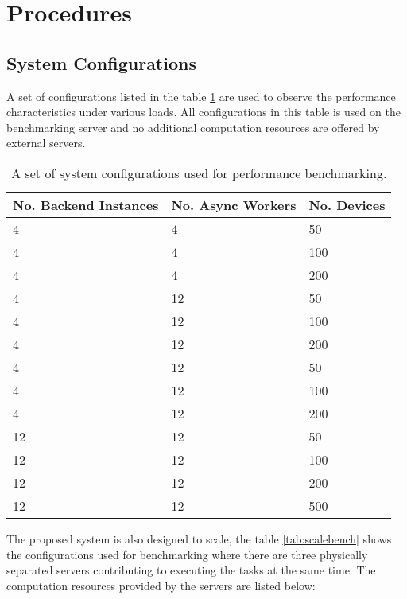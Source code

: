 \documentclass[../thesis.tex]{subfiles}
\begin{document}
\section{Procedures}

\subsection{System Configurations}
A set of configurations listed in the table \ref{tab:sysconfbench} are used to observe the performance characteristics under various loads. All configurations in this table is used on the benchmarking server and no additional computation resources are offered by external servers. 
\begin{table}[h!]
	\begin{center}
		\caption{A set of system configurations used for performance benchmarking.}
		\label{tab:sysconfbench}
		\begin{tabular}{l|l|l}
			\toprule
			\textbf{No. Backend Instances} & \textbf{No. Async Workers} & \textbf{No. Devices}\\
			\midrule
			4 & 4 & 50\\
			4 & 4 & 100\\
			4 & 4 & 200\\
			4 & 12 & 50\\
			4 & 12 & 100\\
			4 & 12 & 200\\
			4 & 12 & 50\\
			4 & 12 & 100\\
			4 & 12 & 200\\
			12 & 12 & 50\\
			12 & 12 & 100\\
			12 & 12 & 200\\
			12 & 12 & 500\\
			\bottomrule
		\end{tabular}
	\end{center}
\end{table}

The proposed system is also designed to scale, the table \ref{tab:scalebench} shows the configurations used for benchmarking where there are three physically separated servers contributing to executing the tasks at the same time. The computation resources provided by the servers are listed below:
\end{document}
